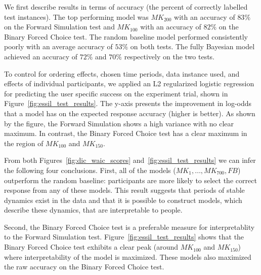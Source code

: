 \documentclass[letterpaper]{article} %
\begin{document}
We first describe results in terms of accuracy (the percent of correctly labelled test instances).
The top performing model was $MK_{200}$ with an accuracy of $83\%$ on the Forward Simulation  test and $MK_{100}$  with an accuracy of $82\%$ on the Binary Forced Choice test.
The random baseline model performed consistently poorly with an average accuracy of $53\%$ on both tests.
The fully Bayesian model achieved an accuracy of $72\%$ and $70\%$ respectively on the two tests.

To control for ordering effects, chosen time periods, data instance used, and effects of individual participants, we applied an L2 regularized logistic regression for predicting  the user specific success on the experiment trial, shown  in  Figure~\ref{fig:essil_test_results}. The y-axis presents the improvement in log-odds that a model has on the expected response accuracy (higher is better).
As shown by the figure,  the Forward Simulation shows a high variance with no clear maximum. In contrast, the Binary Forced Choice test has a clear maximum in the region of $MK_{100}$ and $MK_{150}$.

From both Figures~\ref{fig:dic_waic_scores} and~\ref{fig:essil_test_results} we can infer the following four conclusions.
First, all of the models ($MK_{1},\ldots,MK_{700}, FB$) outperform the random baseline: participants are more likely to select the correct response from any of these models. This result suggests that periods of stable dynamics  exist in the data and that it is possible to construct models, which describe these dynamics, that are interpretable to people.

Second, the Binary Forced Choice test is a preferable measure for interpretablity   to the Forward Simulation test. Figure~\ref{fig:essil_test_results} shows that the Binary Forced Choice test exhibits a clear peak (around $MK_{100}$ and $MK_{150}$) where interpretability of the model is maximized.
These models also maximized the  raw accuracy on the Binary Forced Choice test.
\end{document}
